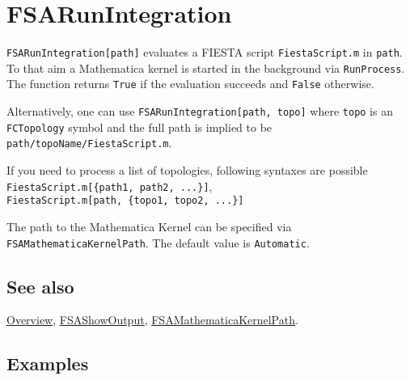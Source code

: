 \documentclass[../FeynHelpersManual.tex]{subfiles}
\begin{document}
\begin{Shaded}
\begin{Highlighting}[]
 
\end{Highlighting}
\end{Shaded}

\hypertarget{fsarunintegration}{
\section{FSARunIntegration}\label{fsarunintegration}}

\texttt{FSARunIntegration[\allowbreak{}path]} evaluates a FIESTA script
\texttt{FiestaScript.m} in \texttt{path}. To that aim a Mathematica
kernel is started in the background via \texttt{RunProcess}. The
function returns \texttt{True} if the evaluation succeeds and
\texttt{False} otherwise.

Alternatively, one can use
\texttt{FSARunIntegration[\allowbreak{}path,\ \allowbreak{}topo]} where
\texttt{topo} is an \texttt{FCTopology} symbol and the full path is
implied to be \texttt{path/topoName/FiestaScript.m}.

If you need to process a list of topologies, following syntaxes are
possible
\texttt{FiestaScript.m[\allowbreak{}\{\allowbreak{}path1,\ \allowbreak{}path2,\ \allowbreak{}...\}]},
\texttt{FiestaScript.m[\allowbreak{}path,\ \allowbreak{}\{\allowbreak{}topo1,\ \allowbreak{}topo2,\ \allowbreak{}...\}]}

The path to the Mathematica Kernel can be specified via
\texttt{FSAMathematicaKernelPath}. The default value is
\texttt{Automatic}.

\subsection{See also}

\hyperlink{toc}{Overview}, \hyperlink{fsashowoutput}{FSAShowOutput},
\hyperlink{fsamathematicakernelpath}{FSAMathematicaKernelPath}.

\subsection{Examples}
\end{document}
